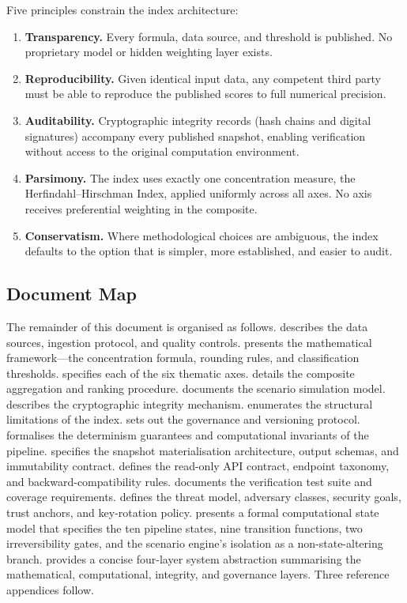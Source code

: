 Five principles constrain the index architecture:

\begin{enumerate}[label=\textbf{P\arabic*}.]
  \item \textbf{Transparency.}  Every formula, data source, and threshold is
    published.  No proprietary model or hidden weighting layer exists.
  \item \textbf{Reproducibility.}  Given identical input data, any competent
    third party must be able to reproduce the published scores to full
    numerical precision.
  \item \textbf{Auditability.}  Cryptographic integrity records (hash chains
    and digital signatures) accompany every published snapshot, enabling
    verification without access to the original computation environment.
  \item \textbf{Parsimony.}  The index uses exactly one concentration
    measure, the Herfindahl--Hirschman Index, applied uniformly across all
    axes.  No axis receives preferential weighting in the composite.
  \item \textbf{Conservatism.}  Where methodological choices are ambiguous,
    the index defaults to the option that is simpler, more established, and
    easier to audit.
\end{enumerate}

\subsection{Document Map}\label{sec:intro:map}

The remainder of this document is organised as follows.
 describes the data sources, ingestion protocol,
and quality controls.   presents the mathematical
framework---the concentration formula, rounding rules, and classification
thresholds.   specifies each of the six thematic
axes.   details the composite aggregation and ranking
procedure.   documents the scenario simulation
model.   describes the cryptographic integrity
mechanism.   enumerates the structural limitations of the
index.   sets out the governance and versioning protocol.
 formalises the determinism guarantees and computational
invariants of the pipeline.   specifies the
snapshot materialisation architecture, output schemas, and immutability
contract.   defines the read-only API contract,
endpoint taxonomy, and backward-compatibility rules.
 documents the verification test suite and coverage
requirements.   defines the threat model, adversary
classes, security goals, trust anchors, and key-rotation policy.
 presents a formal computational state model that
specifies the ten pipeline states, nine transition functions, two
irreversibility gates, and the scenario engine's isolation as a
non-state-altering branch.   provides a
concise four-layer system abstraction summarising the mathematical,
computational, integrity, and governance layers.
Three reference appendices follow.
